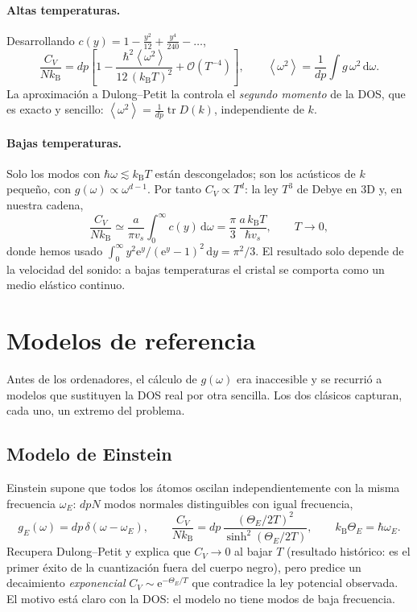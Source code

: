 \documentclass[11pt,a4paper]{article}
\newcommand{\kB}{k_{\mathrm B}}
\newcommand{\dd}{\mathrm{d}}
\newcommand{\ee}{\mathrm{e}}
\newcommand{\avg}[1]{\left\langle #1\right\rangle}
\newcommand{\vs}{v_{s}}
\begin{document}
\paragraph{Altas temperaturas.} Desarrollando $c(y)=1-\frac{y^2}{12}+\frac{y^4}{240}-\dots$,
\begin{equation}
\frac{C_V}{N\kB}= dp\left[1-\frac{\hbar^2\avg{\omega^2}}{12\,(\kB T)^2}+\mathcal O(T^{-4})\right],
\qquad \avg{\omega^2}=\frac{1}{dp}\int g\,\omega^2\,\dd\omega .
\label{eq:highT}
\end{equation}
La aproximación a Dulong–Petit la controla el \emph{segundo momento} de la DOS,
que es exacto y sencillo: $\avg{\omega^2}=\frac{1}{dp}\operatorname{tr}D(k)$,
independiente de $k$.

\paragraph{Bajas temperaturas.} Solo los modos con $\hbar\omega\lesssim\kB T$
están descongelados; son los acústicos de $k$ pequeño, con $g(\omega)\propto
\omega^{d-1}$. Por tanto $C_V\propto T^d$: la ley $T^3$ de Debye en 3D y, en
nuestra cadena,
\begin{equation}
\frac{C_V}{N\kB}\simeq \frac{a}{\pi\vs}\int_0^\infty c(y)\,\dd\omega
=\frac{\pi}{3}\,\frac{a\,\kB T}{\hbar \vs},
\qquad T\to0,
\label{eq:lowT}
\end{equation}
donde hemos usado $\int_0^\infty y^2\ee^y/(\ee^y-1)^2\,\dd y=\pi^2/3$. El
resultado solo depende de la velocidad del sonido: a bajas temperaturas el
cristal se comporta como un medio elástico continuo.

\section{Modelos de referencia}\label{sec:modelos}

Antes de los ordenadores, el cálculo de $g(\omega)$ era inaccesible y se
recurrió a modelos que sustituyen la DOS real por otra sencilla. Los dos
clásicos capturan, cada uno, un extremo del problema.

\subsection{Modelo de Einstein}

Einstein supone que todos los átomos oscilan independientemente con la misma
frecuencia $\omega_E$: $dpN$ modos normales distinguibles con igual
frecuencia,
\begin{equation}
g_E(\omega)=dp\,\delta(\omega-\omega_E),\qquad
\frac{C_V}{N\kB}=dp\,\frac{(\Theta_E/2T)^2}{\sinh^2(\Theta_E/2T)},\qquad
\kB\Theta_E=\hbar\omega_E .
\end{equation}
Recupera Dulong–Petit y explica que $C_V\to0$ al bajar $T$ (resultado
histórico: es el primer éxito de la cuantización fuera del cuerpo negro), pero
predice un decaimiento \emph{exponencial} $C_V\sim \ee^{-\Theta_E/T}$ que
contradice la ley potencial observada. El motivo está claro con la DOS: el
modelo no tiene modos de baja frecuencia.
\end{document}

